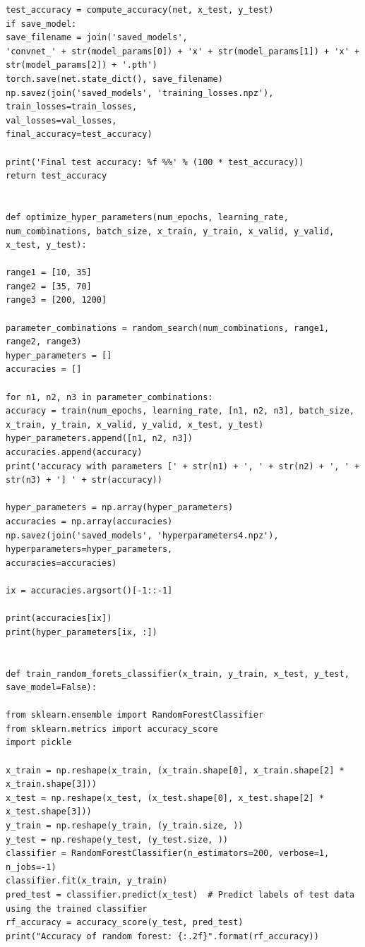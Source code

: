 \documentclass[aps,prb,10pt,twocolumn,groupedaddress]{revtex4-1}
\begin{document}
\begin{lstlisting}
test_accuracy = compute_accuracy(net, x_test, y_test)
if save_model:
save_filename = join('saved_models',
'convnet_' + str(model_params[0]) + 'x' + str(model_params[1]) + 'x' + str(model_params[2]) + '.pth')
torch.save(net.state_dict(), save_filename)
np.savez(join('saved_models', 'training_losses.npz'),
train_losses=train_losses,
val_losses=val_losses,
final_accuracy=test_accuracy)

print('Final test accuracy: %f %%' % (100 * test_accuracy))
return test_accuracy


def optimize_hyper_parameters(num_epochs, learning_rate, num_combinations, batch_size, x_train, y_train, x_valid, y_valid, x_test, y_test):

range1 = [10, 35]
range2 = [35, 70]
range3 = [200, 1200]

parameter_combinations = random_search(num_combinations, range1, range2, range3)
hyper_parameters = []
accuracies = []

for n1, n2, n3 in parameter_combinations:
accuracy = train(num_epochs, learning_rate, [n1, n2, n3], batch_size, x_train, y_train, x_valid, y_valid, x_test, y_test)
hyper_parameters.append([n1, n2, n3])
accuracies.append(accuracy)
print('accuracy with parameters [' + str(n1) + ', ' + str(n2) + ', ' + str(n3) + '] ' + str(accuracy))

hyper_parameters = np.array(hyper_parameters)
accuracies = np.array(accuracies)
np.savez(join('saved_models', 'hyperparameters4.npz'),
hyperparameters=hyper_parameters,
accuracies=accuracies)

ix = accuracies.argsort()[-1::-1]

print(accuracies[ix])
print(hyper_parameters[ix, :])


def train_random_forets_classifier(x_train, y_train, x_test, y_test, save_model=False):

from sklearn.ensemble import RandomForestClassifier
from sklearn.metrics import accuracy_score
import pickle

x_train = np.reshape(x_train, (x_train.shape[0], x_train.shape[2] * x_train.shape[3]))
x_test = np.reshape(x_test, (x_test.shape[0], x_test.shape[2] * x_test.shape[3]))
y_train = np.reshape(y_train, (y_train.size, ))
y_test = np.reshape(y_test, (y_test.size, ))
classifier = RandomForestClassifier(n_estimators=200, verbose=1, n_jobs=-1)
classifier.fit(x_train, y_train)
pred_test = classifier.predict(x_test)  # Predict labels of test data using the trained classifier
rf_accuracy = accuracy_score(y_test, pred_test)
print("Accuracy of random forest: {:.2f}".format(rf_accuracy))


\end{lstlisting}
\end{document}
